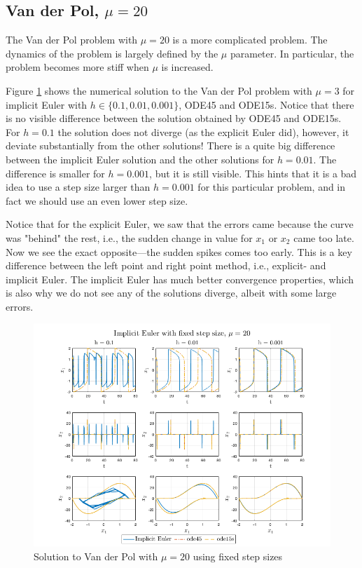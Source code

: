 \subsection{Van der Pol, $\mu = 20$}
The Van der Pol problem with $\mu = 20$ is a more complicated problem. The dynamics of the problem is largely defined by the $\mu$ parameter. In particular, the problem becomes more stiff when $\mu$ is increased.

Figure \ref{fig3:fixed_mu20} shows the numerical solution to the Van der Pol problem with $\mu = 3$ for implicit Euler with $h \in \{0.1, 0.01, 0.001\}$, ODE45 and ODE15s. Notice that there is no visible difference between the solution obtained by ODE45 and ODE15s. For $h=0.1$ the solution does not diverge (as the explicit Euler did), however, it deviate substantially from the other solutions! There is a quite big difference between the implicit Euler solution and the other solutions for $h=0.01$. The difference is smaller for $h=0.001$, but it is still visible. This hints that it is a bad idea to use a step size larger than $h=0.001$ for this particular problem, and in fact we should use an even lower step size.

Notice that for the explicit Euler, we saw that the errors came because the curve was "behind" the rest, i.e., the sudden change in value for $x_1$ or $x_2$ came too late. Now we see the exact opposite---the sudden spikes comes too early. This is a key difference between the left point and right point method, i.e., explicit- and implicit Euler. The implicit Euler has much better convergence properties, which is also why we do not see any of the solutions diverge, albeit with some large errors. 

\begin{figure}[H]
    \centering
    \includegraphics[width=\textwidth]{graphics/opg3/mu20_fixed.png}
    \caption{Solution to Van der Pol with $\mu = 20$ using fixed step sizes}
    \label{fig3:fixed_mu20}
\end{figure}

